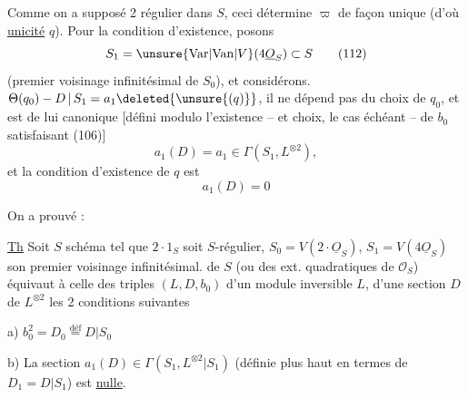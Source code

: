 Comme on a supposé 2 régulier dans $S$, ceci  détermine $\varpi$ de façon unique (d'où \uline{unicité}  $q$). Pour la condition d'existence, posons
\[S_1=\unsure{\mathrm{Var}|\mathrm{Van}|V}(4\underline O_S)\subset S\tag*{(112)}\]
(premier voisinage infinitésimal de $S_0$), et considérons. $\Theta(q_0)-D\,|\,S_1=a_1\deleted{\unsure{(q)}}$, il ne dépend pas du choix de $q_0$, et est de lui  canonique [défini modulo l'existence -- et choix, le cas échéant -- de $b_0$ satisfaisant (106)]
\[a_1(D)=a_1\in\Gamma(S_1,L^{\otimes2}),\tag*{(113)}\]
et la condition  d'existence de $q$ est
\[a_1(D)=0\tag*{(114)}\]

On a prouvé :

\uline{Th} Soit $S$ schéma tel que $2\cdot1_S$ soit $S$-régulier, $S_0=V(2\cdot\underline O_S)$, $S_1=V(4\underline O_S)$ son premier voisinage infinitésimal.   de $S$ (ou des ext. quadratiques de $\mathcal O_S$) équivaut à celle des triples $(L,D,b_0)$ d'un module inversible $L$,  d'une section $D$ de $L^{\otimes2}$   les 2 conditions suivantes

a)  $b_0^2=D_0\overset{\text{déf}}=D|S_0$

b) La section $a_1(D)\in\Gamma(S_1,L^{\otimes2}|S_1)$ (définie plus haut  en termes de $D_1=D|S_1$) est \uline{nulle}.
